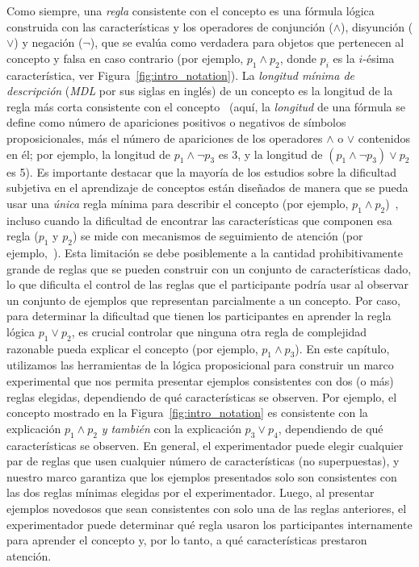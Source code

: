 Como siempre, una \textit{regla} consistente con el concepto es una fórmula lógica construida con las características y los operadores de conjunción ($\land$), disyunción ($\lor$) y negación ($\lnot$), que se evalúa como verdadera para objetos que pertenecen al concepto y falsa en caso contrario (por ejemplo, $p_1 \land p_2$, donde $p_i$ es la $i$-ésima característica, ver Figura~\ref{fig:intro_notation}). La \textit{longitud mínima de descripción} (\textit{MDL} por sus siglas en inglés) de un concepto es la longitud de la regla más corta consistente con el concepto~\cite{grunwald2007minimum} (aquí, la {\em longitud} de una fórmula se define como número de apariciones positivos o negativos de símbolos proposicionales, más el número de apariciones de los operadores $\land$ o $\lor$ contenidos en él; por ejemplo, la longitud de $p_1 \land \lnot p_3 $ es 3, y la longitud de $(p_1 \land \lnot p_3) \lor p_2$ es 5). Es importante destacar que la mayoría de los estudios sobre la dificultad subjetiva en el aprendizaje de conceptos están diseñados de manera que se pueda usar una {\em única} regla mínima para describir el concepto (por ejemplo, $p_1 \land p_2$)~\cite{ashby2005human,feldman2000minimization}, incluso cuando la dificultad de encontrar las características que componen esa regla ($p_1$ y $p_2$) se mide con mecanismos de seguimiento de atención (por ejemplo,~\cite{blair2009extremely, hoffman2010costs}). Esta limitación se debe posiblemente a la cantidad prohibitivamente grande de reglas que se pueden construir con un conjunto de características dado, lo que dificulta el control de las reglas que el participante podría usar al observar un conjunto de ejemplos que representan parcialmente a un concepto. Por caso, para determinar la dificultad que tienen los participantes en aprender la regla lógica $p_1 \lor p_2$, es crucial controlar que ninguna otra regla de complejidad razonable pueda explicar el concepto (por ejemplo, $p_1 \land p_3$). En este capítulo, utilizamos las herramientas de la lógica proposicional para construir un marco experimental que nos permita presentar ejemplos consistentes con dos (o más) reglas elegidas, dependiendo de qué características se observen. Por ejemplo, el concepto mostrado en la Figura~\ref{fig:intro_notation} es consistente con la explicación $p_1 \land p_2$ \textit {y también} con la explicación $p_3 \lor p_4$, dependiendo de qué características se observen. En general, el experimentador puede elegir cualquier par de reglas que usen cualquier número de características (no superpuestas), y nuestro marco garantiza que los ejemplos presentados solo son consistentes con las dos reglas mínimas elegidas por el experimentador. Luego, al presentar ejemplos novedosos que sean consistentes con solo una de las reglas anteriores, el experimentador puede determinar qué regla usaron los participantes internamente para aprender el concepto y, por lo tanto, a qué características prestaron atención.


